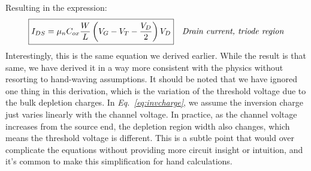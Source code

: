 Resulting in the expression:
    \begin{align} 
        \Aboxed{I_{DS} = \mu_n C_{ox} \frac{W}{L} \left(V_G - V_T - \frac{V_D}{2}\right) V_D}
        &\textit{Drain current, triode region}
        \label{eq:ids_triode}
    \end{align}
Interestingly, this is the same equation we derived earlier.  While the result is that same, we have derived it in a way more consistent with the physics without resorting to hand-waving assumptions.  It should be noted that we have ignored one thing in this derivation, which is the variation of the threshold voltage due to the bulk depletion charges.  In \emph{Eq.~\ref{eq:invcharge}}, we assume the inversion charge just varies linearly with the channel voltage. In practice, as the channel voltage increases from the source end, the depletion region width also changes, which means the threshold voltage is different. This is a subtle point that would over complicate the equations without providing more circuit insight or intuition, and it's common to make this simplification for hand calculations.

